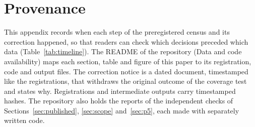 \documentclass{article}
\begin{document}
\appendix

\section{Provenance}
\label{app:provenance}

This appendix records when each step of the preregistered census and its
correction happened, so that readers can check which decisions preceded
which data (Table~\ref{tab:timeline}). The README of the repository (Data
and code availability) maps each section, table and figure of this paper to
its registration, code and output files. The correction notice is a dated
document, timestamped like the registrations, that withdraws the original
outcome of the coverage test and states why. Registrations and intermediate
outputs carry timestamped hashes. The repository also holds the reports of
the independent checks of Sections~\ref{sec:published}, \ref{sec:scope} and~\ref{sec:p5}, each
made with separately written code.
\end{document}
